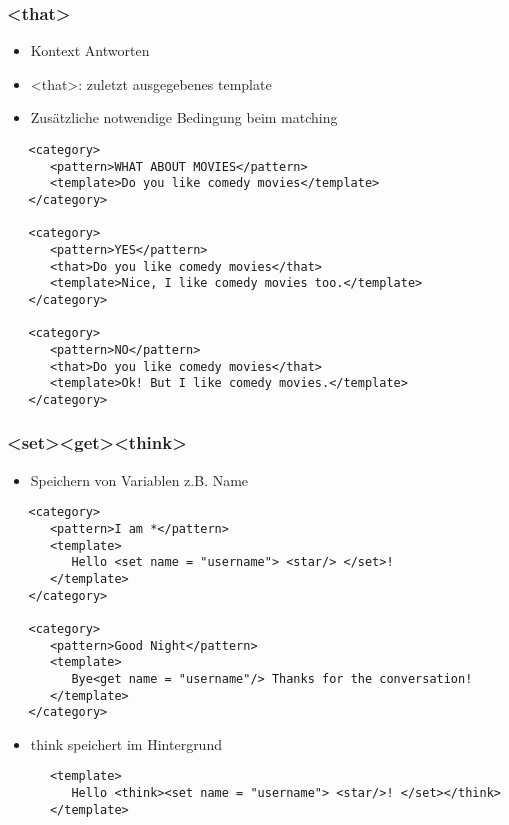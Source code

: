 \documentclass[9pt]{beamer}
\begin{document}
\begin{frame}[fragile]
  \frametitle{\textless that\textgreater}
\begin{itemize}
  \item Kontext Antworten\\
  \item \textless that\textgreater : zuletzt ausgegebenes template\\
  \item Zusätzliche notwendige Bedingung beim matching\\
  \end{itemize}
\begin{lstlisting}
   <category>
      <pattern>WHAT ABOUT MOVIES</pattern>
      <template>Do you like comedy movies</template>  
   </category>
   
   <category>
      <pattern>YES</pattern>
      <that>Do you like comedy movies</that>
      <template>Nice, I like comedy movies too.</template>
   </category>
   
   <category>
      <pattern>NO</pattern>
      <that>Do you like comedy movies</that>
      <template>Ok! But I like comedy movies.</template>
   </category> 
\end{lstlisting}
\end{frame}

\begin{frame}[fragile]
  \frametitle{\textless set\textgreater\textless get\textgreater\textless think\textgreater}
\begin{itemize}
  \item Speichern von Variablen z.B. Name\\
  \end{itemize}
  \begin{lstlisting}
   <category>
      <pattern>I am *</pattern>
      <template>
         Hello <set name = "username"> <star/> </set>!
      </template>  
   </category>  
   
   <category>
      <pattern>Good Night</pattern>
      <template>
         Bye<get name = "username"/> Thanks for the conversation!
      </template>  
   </category>  
\end{lstlisting}
\begin{itemize}
\item think speichert im Hintergrund
\end{itemize}
  \begin{lstlisting}
      <template>
         Hello <think><set name = "username"> <star/>! </set></think>
      </template>
\end{lstlisting}

\end{frame}
\end{document}
